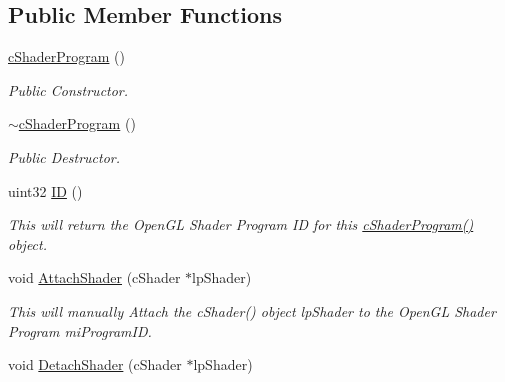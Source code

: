 \subsection*{Public Member Functions}
\begin{DoxyCompactItemize}
\item 
\hypertarget{classc_shader_program_ab032906ae85885362543784fea60cc87}{
\hyperlink{classc_shader_program_ab032906ae85885362543784fea60cc87}{cShaderProgram} ()}
\label{classc_shader_program_ab032906ae85885362543784fea60cc87}

\begin{DoxyCompactList}\small\item\em Public Constructor. \end{DoxyCompactList}\item 
\hypertarget{classc_shader_program_acc07aad8793b71f3bbd389bb56ff2415}{
\hyperlink{classc_shader_program_acc07aad8793b71f3bbd389bb56ff2415}{$\sim$cShaderProgram} ()}
\label{classc_shader_program_acc07aad8793b71f3bbd389bb56ff2415}

\begin{DoxyCompactList}\small\item\em Public Destructor. \end{DoxyCompactList}\item 
\hypertarget{classc_shader_program_a1affe56cbdde65835335cc1aeb21a851}{
uint32 \hyperlink{classc_shader_program_a1affe56cbdde65835335cc1aeb21a851}{ID} ()}
\label{classc_shader_program_a1affe56cbdde65835335cc1aeb21a851}

\begin{DoxyCompactList}\small\item\em This will return the OpenGL Shader Program ID for this \hyperlink{classc_shader_program_ab032906ae85885362543784fea60cc87}{cShaderProgram()} object. \end{DoxyCompactList}\item 
\hypertarget{classc_shader_program_a0f0adf11f436c0d8149b6c5e196fe859}{
void \hyperlink{classc_shader_program_a0f0adf11f436c0d8149b6c5e196fe859}{AttachShader} (cShader $\ast$lpShader)}
\label{classc_shader_program_a0f0adf11f436c0d8149b6c5e196fe859}

\begin{DoxyCompactList}\small\item\em This will manually Attach the cShader() object lpShader to the OpenGL Shader Program miProgramID. \end{DoxyCompactList}\item 
\hypertarget{classc_shader_program_af9df3e552dd368f2a17bc2cd9629c94b}{
void \hyperlink{classc_shader_program_af9df3e552dd368f2a17bc2cd9629c94b}{DetachShader} (cShader $\ast$lpShader)}
\label{classc_shader_program_af9df3e552dd368f2a17bc2cd9629c94b}


\end{DoxyCompactItemize}
